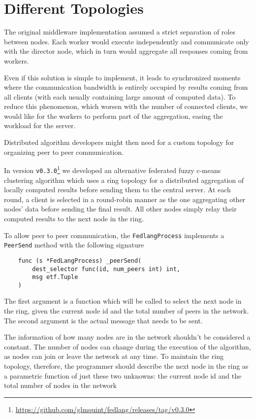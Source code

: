 \chapter{Different Topologies}

The original middleware implementation assumed a strict separation of roles between nodes. Each worker would execute independently and communicate only with the director node, which in turn would aggregate all responses coming from workers.

Even if this solution is simple to implement, it leads to synchronized moments where the communication bandwidth is entirely occupied by results coming from all clients (with each usually containing large amount of computed data). To reduce this phenomenon, which worsen with the number of connected clients, we would like for the workers to perform part of the aggregation, easing the workload for the server. 

Distributed algorithm developers might then need for a custom topology for organizing peer to peer communication.

In version \texttt{v0.3.0}\footnote{\url{https://github.com/glmquint/fedlang/releases/tag/v0.3.0}} we developed an alternative federated fuzzy c-means clustering algorithm which uses a ring topology for a distributed aggregation of locally computed results before sending them to the central server. At each round, a client is selected in a round-robin manner as the one aggregating other nodes' data before sending the final result. All other nodes simply relay their computed results to the next node in the ring.

To allow peer to peer communication, the \texttt{FedlangProcess} implements a \texttt{PeerSend} method with the following signature

\begin{verbatim}
	func (s *FedLangProcess) _peerSend(
		dest_selector func(id, num_peers int) int, 
		msg etf.Tuple
	)
\end{verbatim}

The first argument is a function which will be called to select the next node in the ring, given the current node id and the total number of peers in the network. The second argument is the actual message that needs to be sent.

The information of how many nodes are in the network shouldn't be considered a constant. The number of nodes can change during the execution of the algorithm, as nodes can join or leave the network at any time. To maintain the ring topology, therefore, the programmer should describe the next node in the ring as a parametric function of just these two unknowns: the current node id and the total number of nodes in the network

